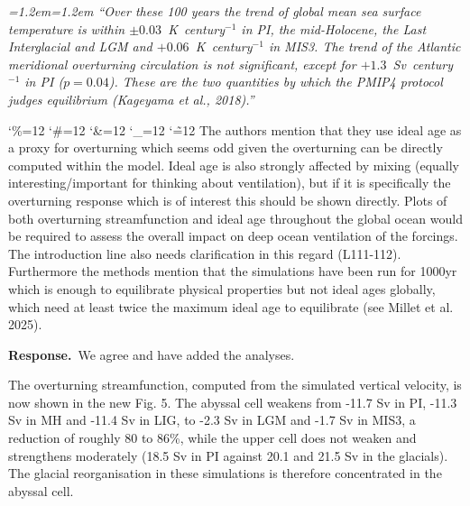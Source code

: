 \documentclass[11pt,a4paper]{article}
\newcommand{\comment}[1]{\par\medskip\noindent\color{black}\begingroup\catcode`\%=12 \catcode`\#=12 \catcode`\&=12 \catcode`\_=12 \catcode`\~=12 \commentbody}
\newcommand{\commentbody}[1]{#1\endgroup\par\smallskip}
\newcommand{\response}{\par\noindent\color{chgcol}\textbf{Response.}\ }
\newenvironment{change}{\par\smallskip\color{chgcol}\small\itshape\leftskip=1.2em\rightskip=1.2em\noindent\ignorespaces}{\par\smallskip}
\begin{document}
\begin{change}
``Over these 100 years the trend of global mean sea surface temperature is within $\pm0.03$~K~century$^{-1}$ in PI, the mid-Holocene, the Last Interglacial and LGM and $+0.06$~K~century$^{-1}$ in MIS3. The trend of the Atlantic meridional overturning circulation is not significant, except for $+1.3$~Sv~century$^{-1}$ in PI ($p = 0.04$). These are the two quantities by which the PMIP4 protocol judges equilibrium (Kageyama et al., 2018).''
\end{change}


\comment{R3}{The authors mention that they use ideal age as a proxy for overturning which seems odd given the overturning can be directly computed within the model. Ideal age is also strongly affected by mixing (equally interesting/important for thinking about ventilation), but if it is specifically the overturning response which is of interest this should be shown directly. Plots of both overturning streamfunction and ideal age throughout the global ocean would be required to assess the overall impact on deep ocean ventilation of the forcings. The introduction line also needs clarification in this regard (L111-112). Furthermore the methods mention that the simulations have been run for 1000yr which is enough to equilibrate physical properties but not ideal ages globally, which need at least twice the maximum ideal age to equilibrate (see Millet et al. 2025).}

\response We agree and have added the analyses.

The overturning streamfunction, computed from the simulated vertical velocity, is now shown in the new Fig. 5. The abyssal cell weakens from -11.7 Sv in PI, -11.3 Sv in MH and -11.4 Sv in LIG, to -2.3 Sv in LGM and -1.7 Sv in MIS3, a reduction of roughly 80 to 86\%, while the upper cell does not weaken and strengthens moderately (18.5 Sv in PI against 20.1 and 21.5 Sv in the glacials). The glacial reorganisation in these simulations is therefore concentrated in the abyssal cell.

\end{document}
